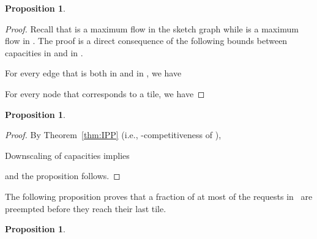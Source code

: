 \documentclass[11pt]{article}
\newtheorem{proposition}[theorem]{Proposition}
\newcommand{\route}{\text{\sc{ipp}}}
\newcommand{\IPP}{\route}
\newenvironment{proof sketch}[1]{\noindent {\emph{Proof sketch of #1:}}}{\hfill \qed}
\begin{document}
\begin{proposition}\label{prop:scaled}
    
\end{proposition}

\begin{proof}
  Recall that  is a maximum flow in the sketch graph  while
   is a maximum flow in .
The proof is a direct consequence of the following bounds between capacities in 
and in .

  For every edge  that is both in  and in , we have
  

 For every node  that corresponds to a tile, we have
  
\end{proof}

\begin{proposition}\label{prop:fipp}
    
\end{proposition}
\begin{proof}
By    Theorem~\ref{thm:IPP} (i.e., -competitiveness of \IPP),

Downscaling of capacities implies

and the proposition follows.
\end{proof}


The following proposition proves that a fraction of at most  of the
requests in \IPP\ are preempted before they reach their last tile.
\begin{proposition}\label{prop:preemptions}
    
\end{proposition}
\end{document}
